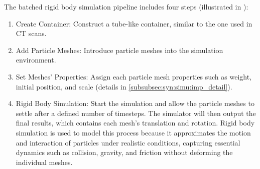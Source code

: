 \documentclass[preprint,12pt]{elsarticle}
\begin{document}
The batched rigid body simulation pipeline includes four steps (illustrated in ): 
\begin{enumerate}
    \item Create Container: Construct a tube-like container, similar to the one used in CT scans.
    \item Add Particle Meshes: Introduce particle meshes into the simulation environment.
    \item Set Meshes' Properties: Assign each particle mesh properties such as weight, initial position, and scale (details in \ref{subsubsec:syn:simu:imp_detail}).
    \item Rigid Body Simulation: Start the simulation and allow the particle meshes to settle after a defined number of timesteps. The simulator will then output the final results, which contains each mesh's translation and rotation.
    Rigid body simulation is used to model this process because it approximates the motion and interaction of particles under realistic conditions, capturing essential dynamics such as collision, gravity, and friction without deforming the individual meshes.
\end{enumerate}
\end{document}
